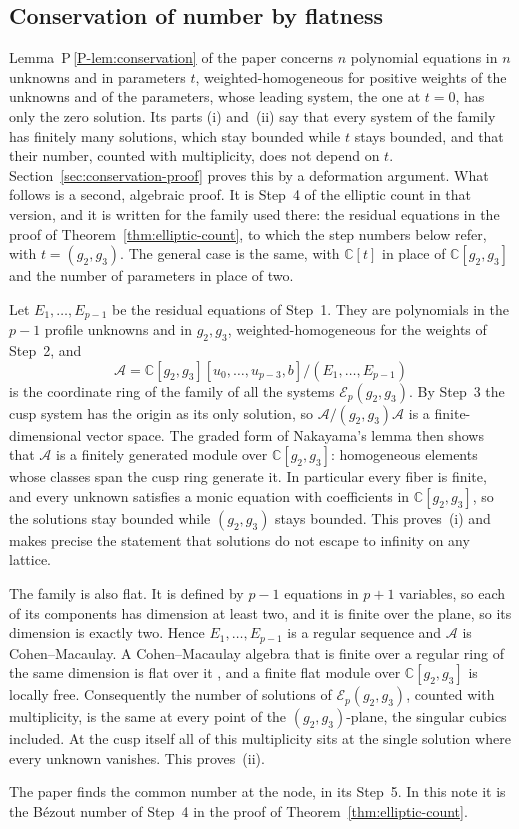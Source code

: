 \documentclass[11pt]{article}
\newcommand{\CC}{\mathbb C}
\numberwithin{equation}{section}
\begin{document}
\subsection{Conservation of number by flatness}

Lemma~P\,\ref{P-lem:conservation} of the paper concerns \(n\) polynomial
equations in \(n\) unknowns and in parameters \(t\), weighted-homogeneous
for positive weights of the unknowns and of the parameters, whose
leading system, the one at \(t=0\), has only the zero solution. Its
parts (i) and~(ii) say that every system of the family has finitely
many solutions, which stay bounded while \(t\) stays bounded, and that
their number, counted with multiplicity, does not depend on \(t\).
Section~\ref{sec:conservation-proof} proves this by a deformation
argument. What follows is a second, algebraic proof. It is Step~4 of the elliptic count in that
version, and it is written for the family used there: the residual
equations in the proof of Theorem~\ref{thm:elliptic-count}, to which
the step numbers below refer, with \(t=(g_2,g_3)\). The general case is
the same, with \(\CC[t]\) in place of \(\CC[g_2,g_3]\) and the number
of parameters in place of two.

Let \(E_1,\ldots,E_{p-1}\) be the residual equations of Step~1. They
are polynomials in the \(p-1\) profile unknowns and in \(g_2,g_3\),
weighted-homogeneous for the weights of Step~2, and
\[
 \mathcal A=\CC[g_2,g_3][u_0,\ldots,u_{p-3},b]/(E_1,\ldots,E_{p-1})
\]
is the coordinate ring of the family of all the systems
\(\mathcal E_p(g_2,g_3)\). By Step~3 the cusp system has the origin as
its only solution, so \(\mathcal A/(g_2,g_3)\mathcal A\) is a
finite-dimensional vector space. The graded form of Nakayama's lemma
then shows that \(\mathcal A\) is a finitely generated module over
\(\CC[g_2,g_3]\): homogeneous elements whose classes span the cusp ring
generate it. In particular every fiber is finite, and every unknown
satisfies a monic equation with coefficients in \(\CC[g_2,g_3]\), so
the solutions stay bounded while \((g_2,g_3)\) stays bounded. This
proves~(i) and makes precise the statement that solutions do not
escape to infinity on any lattice.

The family is also flat. It is defined by \(p-1\) equations in \(p+1\)
variables, so each of its components has dimension at least two, and it
is finite over the plane, so its dimension is exactly two. Hence
\(E_1,\ldots,E_{p-1}\) is a regular sequence and \(\mathcal A\) is
Cohen--Macaulay. A Cohen--Macaulay algebra that is finite over a
regular ring of the same dimension is flat over it
\citep[Theorem~23.1]{Matsumura1986}, and a finite flat module over
\(\CC[g_2,g_3]\) is locally free. Consequently the number of solutions
of \(\mathcal E_p(g_2,g_3)\), counted with multiplicity, is the same at
every point of the \((g_2,g_3)\)-plane, the singular cubics included.
At the cusp itself all of this multiplicity sits at the single solution
where every unknown vanishes. This proves~(ii).

The paper finds the common number at the node, in its Step~5. In this
note it is the B\'ezout number of Step~4 in the proof of
Theorem~\ref{thm:elliptic-count}.

{\small\raggedright


}
\end{document}
